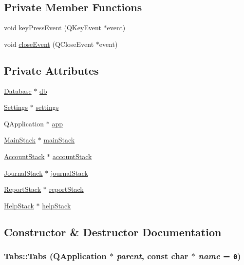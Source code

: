 \subsection*{Private Member Functions}
\begin{CompactItemize}
\item 
void \hyperlink{classTabs_d0}{key\-Press\-Event} (QKey\-Event $\ast$event)
\item 
void \hyperlink{classTabs_d1}{close\-Event} (QClose\-Event $\ast$event)
\end{CompactItemize}
\subsection*{Private Attributes}
\begin{CompactItemize}
\item 
\hyperlink{classDatabase}{Database} $\ast$ \hyperlink{classTabs_r0}{db}
\item 
\hyperlink{classSettings}{Settings} $\ast$ \hyperlink{classTabs_r1}{settings}
\item 
QApplication $\ast$ \hyperlink{classTabs_r2}{app}
\item 
\hyperlink{classMainStack}{Main\-Stack} $\ast$ \hyperlink{classTabs_r3}{main\-Stack}
\item 
\hyperlink{classAccountStack}{Account\-Stack} $\ast$ \hyperlink{classTabs_r4}{account\-Stack}
\item 
\hyperlink{classJournalStack}{Journal\-Stack} $\ast$ \hyperlink{classTabs_r5}{journal\-Stack}
\item 
\hyperlink{classReportStack}{Report\-Stack} $\ast$ \hyperlink{classTabs_r6}{report\-Stack}
\item 
\hyperlink{classHelpStack}{Help\-Stack} $\ast$ \hyperlink{classTabs_r7}{help\-Stack}
\end{CompactItemize}


\subsection{Constructor \& Destructor Documentation}
\hypertarget{classTabs_a0}{
\subsubsection[Tabs]{\setlength{\rightskip}{0pt plus 5cm}Tabs::Tabs (QApplication $\ast$ {\em parent}, const char $\ast$ {\em name} = {\tt 0})}}
\label{classTabs_a0}


